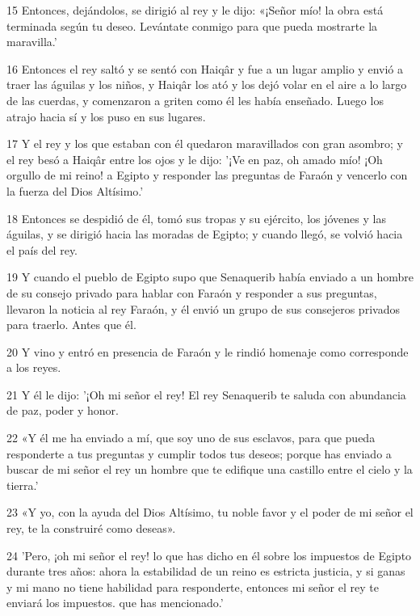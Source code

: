 \par 15 Entonces, dejándolos, se dirigió al rey y le dijo: «¡Señor mío! la obra está terminada según tu deseo. Levántate conmigo para que pueda mostrarte la maravilla.'

\par 16 Entonces el rey saltó y se sentó con Haiqâr y fue a un lugar amplio y envió a traer las águilas y los niños, y Haiqâr los ató y los dejó volar en el aire a lo largo de las cuerdas, y comenzaron a griten como él les había enseñado. Luego los atrajo hacia sí y los puso en sus lugares.

\par 17 Y el rey y los que estaban con él quedaron maravillados con gran asombro; y el rey besó a Haiqâr entre los ojos y le dijo: '¡Ve en paz, oh amado mío! ¡Oh orgullo de mi reino! a Egipto y responder las preguntas de Faraón y vencerlo con la fuerza del Dios Altísimo.'

\par 18 Entonces se despidió de él, tomó sus tropas y su ejército, los jóvenes y las águilas, y se dirigió hacia las moradas de Egipto; y cuando llegó, se volvió hacia el país del rey.

\par 19 Y cuando el pueblo de Egipto supo que Senaquerib había enviado a un hombre de su consejo privado para hablar con Faraón y responder a sus preguntas, llevaron la noticia al rey Faraón, y él envió un grupo de sus consejeros privados para traerlo. Antes que él.

\par 20 Y vino y entró en presencia de Faraón y le rindió homenaje como corresponde a los reyes.

\par 21 Y él le dijo: '¡Oh mi señor el rey! El rey Senaquerib te saluda con abundancia de paz, poder y honor.

\par 22 «Y él me ha enviado a mí, que soy uno de sus esclavos, para que pueda responderte a tus preguntas y cumplir todos tus deseos; porque has enviado a buscar de mi señor el rey un hombre que te edifique una castillo entre el cielo y la tierra.'

\par 23 «Y yo, con la ayuda del Dios Altísimo, tu noble favor y el poder de mi señor el rey, te la construiré como deseas».

\par 24 'Pero, ¡oh mi señor el rey! lo que has dicho en él sobre los impuestos de Egipto durante tres años: ahora la estabilidad de un reino es estricta justicia, y si ganas y mi mano no tiene habilidad para responderte, entonces mi señor el rey te enviará los impuestos. que has mencionado.'

